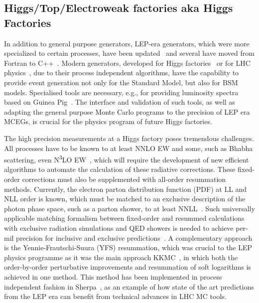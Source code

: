 \documentclass[10pt,a4paper]{article}
\begin{document}
\subsection{Higgs/Top/Electroweak factories aka Higgs
Factories}\label{higgstopelectroweak-factories-aka-higgs-factories}

In addition to general purpose generators, LEP-era generators, which were more
specialized to certain processes, have been
updated~\cite{Jadach:1999vf,CarloniCalame:2003yt,Jadach:1991by,Denner:2000bj}
and several have moved from Fortran to C++~\cite{Jadach:2022mbe, Sjostrand:2014zea}.
Modern generators, developed for Higgs factories~\cite{Kilian:2007gr, Sherpa:2024mfk}
or for LHC physics~\cite{Frixione:2021zdp,Sherpa:2019gpd},  due to their process
independent algorithms, have the capability to provide event generation not only
for the Standard Model, but also for BSM models. Specialised tools are necessary,
e.g., for providing luminosity spectra~\cite{Ohl:1996fi} based on Guinea Pig~\cite{Schulte:1998au}.
The interface and validation of such tools, as well as adapting the general purpose
Monte Carlo programs to the precision of LEP era MCEGs, is crucial for the
physics program of future Higgs factories.

The high precision measurements at a Higgs factory poses tremendous challenges.
All processes have to be known to at least NNLO EW and
some, such as Bhabha scattering, even N\textsuperscript{3}LO
EW~\cite{ECFAHiggsStudy:2025}, which will require the development of new
efficient algorithms to automate the calculation of these radiative corrections.
These fixed-order corrections must also be supplemented with all-order
resummation methods. Currently, the electron parton distribution function (PDF)
at LL and NLL order is known, which must be matched to an exclusive description
of the photon phase space, such as a parton shower, to at least
NNLL~\cite{ECFAHiggsStudy:2025,Bertone:2019hks,Frixione:2019lga}. Such
universally applicable matching formalism between fixed-order and resummed
calculations with exclusive radiation simulations and QED showers is needed to
achieve per-mil precision for inclusive and exclusive
predictions~\cite{Frixione:2022ofv}. A complementary approach is the
Yennie-Frautschi-Suura (YFS) resummation, which was crucial to the LEP physics
programme as it was the main approach KKMC~\cite{Jadach:1999vf}, in which both
the order-by-order perturbative improvements and resummation of soft logarithms
is achieved in one method. This method has been implemented in process
independent fashion in Sherpa~\cite{Krauss:2022ajk}, as an example of how state
of the art predictions from the LEP era can benefit from technical advances in
LHC MC tools.
\end{document}
